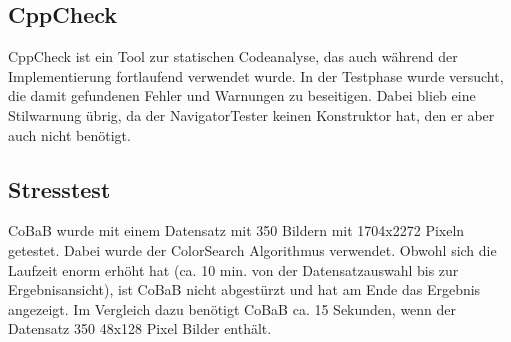 \subsection{CppCheck}
CppCheck ist ein Tool zur statischen Codeanalyse, das auch während der Implementierung fortlaufend verwendet wurde. In der Testphase wurde versucht, die damit gefundenen Fehler und Warnungen zu beseitigen. Dabei blieb eine Stilwarnung übrig, da der NavigatorTester keinen Konstruktor hat, den er aber auch nicht benötigt.

\subsection{Stresstest}
CoBaB wurde mit einem Datensatz mit 350 Bildern mit 1704x2272 Pixeln getestet. Dabei wurde der ColorSearch Algorithmus verwendet. Obwohl sich die Laufzeit enorm erhöht hat (ca. 10 min. von der Datensatzauswahl bis zur Ergebnisansicht), ist CoBaB nicht abgestürzt und hat am Ende das Ergebnis angezeigt. Im Vergleich dazu benötigt CoBaB ca. 15 Sekunden, wenn der Datensatz 350 48x128 Pixel Bilder enthält.